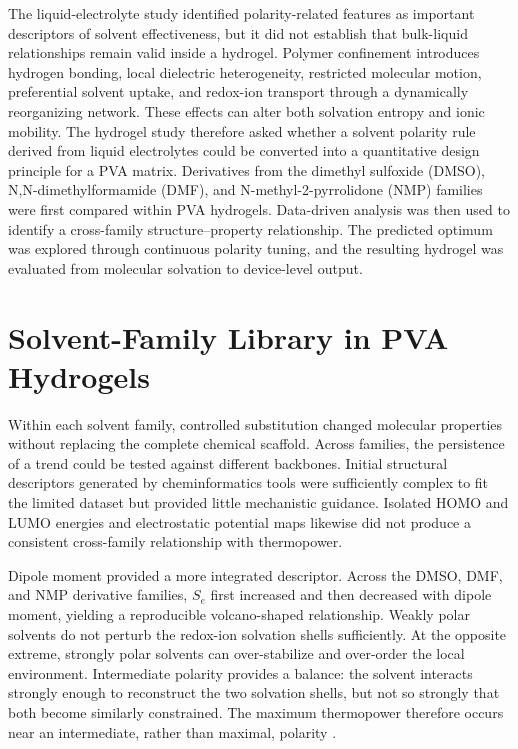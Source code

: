 \documentclass[a4paper,12pt]{report}
\begin{document}
The liquid-electrolyte study identified polarity-related features as important
descriptors of solvent effectiveness, but it did not establish that bulk-liquid
relationships remain valid inside a hydrogel. Polymer confinement introduces
hydrogen bonding, local dielectric heterogeneity, restricted molecular motion,
preferential solvent uptake, and redox-ion transport through a dynamically
reorganizing network. These effects can alter both solvation entropy and ionic
mobility. The hydrogel study therefore asked whether a solvent polarity rule
derived from liquid electrolytes could be converted into a quantitative design
principle for a PVA matrix. Derivatives from the
dimethyl sulfoxide (DMSO), N,N-dimethylformamide (DMF), and
N-methyl-2-pyrrolidone (NMP) families were first compared within PVA
hydrogels. Data-driven analysis was then used to identify a cross-family
structure--property relationship. The predicted optimum was explored through
continuous polarity tuning, and the resulting hydrogel was evaluated from
molecular solvation to device-level output.

\section{Solvent-Family Library in PVA Hydrogels}

Within each solvent family, controlled substitution changed molecular
properties without replacing the complete chemical scaffold. Across families,
the persistence of a trend could be tested against different backbones.
Initial structural descriptors generated by cheminformatics tools were
sufficiently complex to fit the limited dataset but provided little
mechanistic guidance. Isolated HOMO and LUMO energies and electrostatic
potential maps likewise did not produce a consistent cross-family relationship
with thermopower.

Dipole moment provided a more integrated descriptor. Across the DMSO, DMF, and
NMP derivative families, $S_e$ first increased and then decreased with dipole
moment, yielding a reproducible volcano-shaped relationship. Weakly polar
solvents do not perturb the redox-ion solvation shells sufficiently. At the
opposite extreme, strongly polar solvents can over-stabilize and over-order the
local environment. Intermediate polarity provides a balance: the solvent
interacts strongly enough to reconstruct the two solvation shells, but not so
strongly that both become similarly constrained. The maximum thermopower
therefore occurs near an intermediate, rather than maximal, polarity
.
\end{document}
